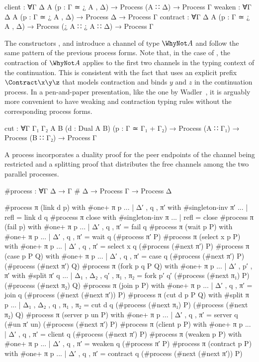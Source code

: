 \begin{AgdaAlign}
\begin{code}
   client    : ∀{Γ Δ A} (p : Γ ≃ ¿ A , Δ) → Process (A ∷ Δ) → Process Γ
   weaken    : ∀{Γ Δ A} (p : Γ ≃ ¿ A , Δ) → Process Δ → Process Γ
   contract  : ∀{Γ Δ A} (p : Γ ≃ ¿ A , Δ) → Process (¿ A ∷ ¿ A ∷ Δ) → Process Γ
\end{code}

The constructors ,
 and 
introduce a channel of type $\WhyNot A$ and follow the same pattern of the
previous process forms. Note that, in the case of
, the contraction of $\WhyNot A$ applies to
the first two channels in the typing context of the continuation. This is
consistent with the fact that \Calculus uses an explicit prefix
$\Contract\x\y\z$ that models contraction and binds $y$ and $z$ in the
continuation process. In a pen-and-paper presentation, like the one by
Wadler~\citep{Wadler14}, it is arguably more convenient to have weaking and
contraction typing rules without the corresponding process forms.

\begin{code}
   cut       : ∀{Γ Γ₁ Γ₂ A B} (d : Dual A B) (p : Γ ≃ Γ₁ + Γ₂) →
               Process (A ∷ Γ₁) → Process (B ∷ Γ₂) → Process Γ
\end{code}

A  process incorporates a duality proof for the
peer endpoints of the channel being restricted and a splitting proof that
distributes the free channels among the two parallel processes.

\end{AgdaAlign}

\begin{code}
#process : ∀{Γ Δ} → Γ # Δ → Process Γ → Process Δ
\end{code}
\begin{code}[hide]
#process π (link d p) with #one+ π p
... | Δ′ , q , π′ with #singleton-inv π′
... | refl = link d q
#process π close with #singleton-inv π
... | refl = close
#process π (fail p) with #one+ π p
... | Δ′ , q , π′ = fail q
#process π (wait p P) with #one+ π p
... | Δ′ , q , π′ = wait q (#process π′ P)
#process π (select x p P) with #one+ π p
... | Δ′ , q , π′ = select x q (#process (#next π′) P)
#process π (case p P Q) with #one+ π p
... | Δ′ , q , π′ = case q (#process (#next π′) P) (#process (#next π′) Q)
#process π (fork p q P Q) with #one+ π p
... | Δ′ , p′ , π′ with #split π′ q
... | Δ₁ , Δ₂ , q′ , π₁ , π₂ = fork p′ q′ (#process (#next π₁) P) (#process (#next π₂) Q)
#process π (join p P) with #one+ π p
... | Δ′ , q , π′ = join q (#process (#next (#next π′)) P)
#process π (cut d p P Q) with #split π p
... | Δ₁ , Δ₂ , q , π₁ , π₂ = cut d q (#process (#next π₁) P) (#process (#next π₂) Q)
#process π (server p un P) with #one+ π p
... | Δ′ , q , π′ = server q (#un π′ un) (#process (#next π′) P)
#process π (client p P) with #one+ π p
... | Δ′ , q , π′ = client q (#process (#next π′) P)
#process π (weaken p P) with #one+ π p
... | Δ′ , q , π′ = weaken q (#process π′ P)
#process π (contract p P) with #one+ π p
... | Δ′ , q , π′ = contract q (#process (#next (#next π′)) P)
\end{code}
